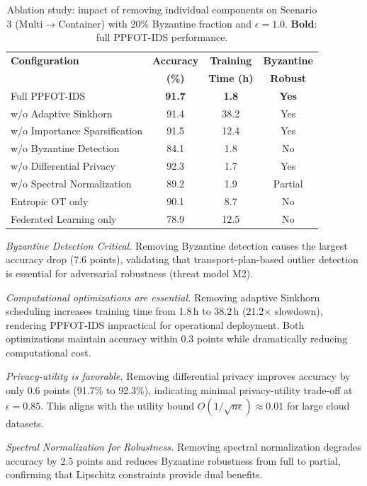 \documentclass{ieeeaccess}
\theoremstyle{plain}
\theoremstyle{definition}
\theoremstyle{remark}
\begin{document}
\begin{table}[!t]
\renewcommand{\arraystretch}{1.3}
\caption{Ablation study: impact of removing individual components on Scenario 3 (Multi$\to$Container) with 20\% Byzantine fraction and $\epsilon = 1.0$. \textbf{Bold}: full PPFOT-IDS performance.}
\label{tab:ablation}
\centering
\begin{tabular}{lccc}
\hline
\textbf{Configuration} & \textbf{Accuracy} & \textbf{Training} & \textbf{Byzantine} \\
 & \textbf{(\%)} & \textbf{Time (h)} & \textbf{Robust} \\
\hline
Full PPFOT-IDS & \textbf{91.7} & \textbf{1.8} & \textbf{Yes} \\
w/o Adaptive Sinkhorn & 91.4 & 38.2 & Yes \\
w/o Importance Sparsification & 91.5 & 12.4 & Yes \\
w/o Byzantine Detection & 84.1 & 1.8 & No \\
w/o Differential Privacy & 92.3 & 1.7 & Yes \\
w/o Spectral Normalization & 89.2 & 1.9 & Partial \\
Entropic OT only & 90.1 & 8.7 & No \\
Federated Learning only & 78.9 & 12.5 & No \\
\hline
\end{tabular}
\end{table}

\textit{Byzantine Detection Critical.} Removing Byzantine detection causes the largest accuracy drop (7.6 points), validating that transport-plan-based outlier detection is essential for adversarial robustness (threat model M2).

\textit{Computational optimizations are essential.} Removing adaptive Sinkhorn scheduling increases training time from 1.8\,h to 38.2\,h (21.2$\times$ slowdown), rendering PPFOT-IDS impractical for operational deployment. Both optimizations maintain accuracy within 0.3 points while dramatically reducing computational cost.

\textit{Privacy-utility is favorable.} Removing differential privacy improves accuracy by only 0.6 points (91.7\% to 92.3\%), indicating minimal privacy-utility trade-off at $\epsilon = 0.85$. This aligns with the utility bound $O(1/\sqrt{n\epsilon}) \approx 0.01$ for large cloud datasets.

\textit{Spectral Normalization for Robustness.} Removing spectral normalization degrades accuracy by 2.5 points and reduces Byzantine robustness from full to partial, confirming that Lipschitz constraints provide dual benefits.
\end{document}
